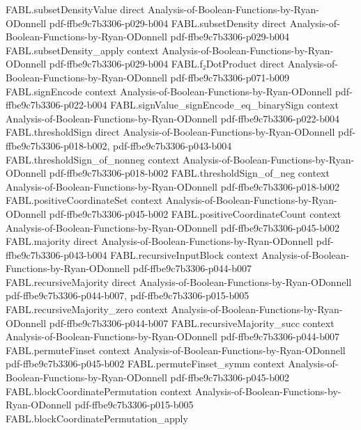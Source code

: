 \begin{theorem}
  {FABL.subsetDensityValue}
  {direct}
  {Analysis-of-Boolean-Functions-by-Ryan-ODonnell}
  {pdf-ffbe9c7b3306-p029-b004}
\proofstep
  {FABL.subsetDensity}
  {direct}
  {Analysis-of-Boolean-Functions-by-Ryan-ODonnell}
  {pdf-ffbe9c7b3306-p029-b004}
\proofstep
  {FABL.subsetDensity_apply}
  {context}
  {Analysis-of-Boolean-Functions-by-Ryan-ODonnell}
  {pdf-ffbe9c7b3306-p029-b004}
\proofstep
  {FABL.f₂DotProduct}
  {direct}
  {Analysis-of-Boolean-Functions-by-Ryan-ODonnell}
  {pdf-ffbe9c7b3306-p071-b009}
\proofstep
  {FABL.signEncode}
  {context}
  {Analysis-of-Boolean-Functions-by-Ryan-ODonnell}
  {pdf-ffbe9c7b3306-p022-b004}
\proofstep
  {FABL.signValue_signEncode_eq_binarySign}
  {context}
  {Analysis-of-Boolean-Functions-by-Ryan-ODonnell}
  {pdf-ffbe9c7b3306-p022-b004}
\proofstep
  {FABL.thresholdSign}
  {direct}
  {Analysis-of-Boolean-Functions-by-Ryan-ODonnell}
  {pdf-ffbe9c7b3306-p018-b002,
    pdf-ffbe9c7b3306-p043-b004}
\proofstep
  {FABL.thresholdSign_of_nonneg}
  {context}
  {Analysis-of-Boolean-Functions-by-Ryan-ODonnell}
  {pdf-ffbe9c7b3306-p018-b002}
\proofstep
  {FABL.thresholdSign_of_neg}
  {context}
  {Analysis-of-Boolean-Functions-by-Ryan-ODonnell}
  {pdf-ffbe9c7b3306-p018-b002}
\proofstep
  {FABL.positiveCoordinateSet}
  {context}
  {Analysis-of-Boolean-Functions-by-Ryan-ODonnell}
  {pdf-ffbe9c7b3306-p045-b002}
\proofstep
  {FABL.positiveCoordinateCount}
  {context}
  {Analysis-of-Boolean-Functions-by-Ryan-ODonnell}
  {pdf-ffbe9c7b3306-p045-b002}
\proofstep
  {FABL.majority}
  {direct}
  {Analysis-of-Boolean-Functions-by-Ryan-ODonnell}
  {pdf-ffbe9c7b3306-p043-b004}
\proofstep
  {FABL.recursiveInputBlock}
  {context}
  {Analysis-of-Boolean-Functions-by-Ryan-ODonnell}
  {pdf-ffbe9c7b3306-p044-b007}
\proofstep
  {FABL.recursiveMajority}
  {direct}
  {Analysis-of-Boolean-Functions-by-Ryan-ODonnell}
  {pdf-ffbe9c7b3306-p044-b007,
    pdf-ffbe9c7b3306-p015-b005}
\proofstep
  {FABL.recursiveMajority_zero}
  {context}
  {Analysis-of-Boolean-Functions-by-Ryan-ODonnell}
  {pdf-ffbe9c7b3306-p044-b007}
\proofstep
  {FABL.recursiveMajority_succ}
  {context}
  {Analysis-of-Boolean-Functions-by-Ryan-ODonnell}
  {pdf-ffbe9c7b3306-p044-b007}
\proofstep
  {FABL.permuteFinset}
  {context}
  {Analysis-of-Boolean-Functions-by-Ryan-ODonnell}
  {pdf-ffbe9c7b3306-p045-b002}
\proofstep
  {FABL.permuteFinset_symm}
  {context}
  {Analysis-of-Boolean-Functions-by-Ryan-ODonnell}
  {pdf-ffbe9c7b3306-p045-b002}
\proofstep
  {FABL.blockCoordinatePermutation}
  {context}
  {Analysis-of-Boolean-Functions-by-Ryan-ODonnell}
  {pdf-ffbe9c7b3306-p015-b005}
\proofstep
  {FABL.blockCoordinatePermutation_apply}

\end{theorem}
